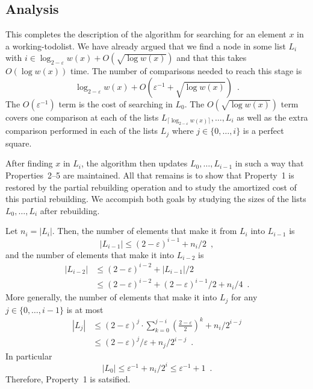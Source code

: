 \documentclass[lotsofwhite]{patmorin}
\newcommand{\eps}{\varepsilon}
\begin{document}
\subsection{Analysis}

This completes the description of the algorithm for searching for an
element $x$ in a working-todolist.  We have already argued that we find
a node in some list $L_i$ with $i\in \log_{2-\eps} w(x) + O(\sqrt{\log
w(x)})$ and that this takes $O(\log w(x))$ time.  The number of comparisons
needed to reach this stage is
\[
     \log_{2-\eps} w(x) + O\left(\eps^{-1} + \sqrt{\log w(x)}\right) \enspace .
\]
The $O(\eps^{-1})$ term is the cost of searching in $L_0$. The
$O(\sqrt{\log w(x)})$ term covers one comparison at each of the lists
$L_{\lceil\log_{2-\eps} w(x)\rceil},\ldots,L_i$ as well as the extra
comparison performed in each of the lists $L_j$ where $j\in\{0,\ldots,i\}$
is a perfect square.

After finding $x$ in $L_i$, the algorithm then updates
$L_0,\ldots,L_{i-1}$ in such a way that Properties~2--5 are maintained.
All that remains is to show that Property~1 is restored by the partial
rebuilding operation and to study the amortized cost of this partial
rebuilding.  We accompish both goals by studying the sizes of the lists
$L_0,\ldots,L_i$ after rebuilding.

Let $n_i=|L_i|$. Then,
the number of elements that make it from $L_i$ into $L_{i-1}$ is 
\[  |L_{i-1}| \le (2-\eps)^{i-1} + n_i/2 \enspace , \]
and the number of elements that make it into $L_{i-2}$ is
\begin{align*}
   |L_{i-2}| & \le (2-\eps)^{i-2} + |L_{i-1}|/2 \\
     & \le (2-\eps)^{i-2} + (2-\eps)^{i-1}/2 + n_i/4 \enspace . 
\end{align*}
More generally, the number of elements that make it into $L_j$ for any $j\in \{0,\ldots,i-1\}$ is at most
\begin{align*}
    |L_j| & \le (2-\eps)^{j} \cdot \sum_{k=0}^{j-i}\left(\frac{2-\eps}{2}\right)^k  + n_i/2^{i-j} \\
       & \le (2-\eps)^j/\eps + n_j/2^{i-j} \enspace .
\end{align*}
In particular
\[
    |L_0| \le \eps^{-1} + n_i/2^i \le \eps^{-1} + 1\enspace .
\]
Therefore, Property~1 is satsified.
\end{document}

